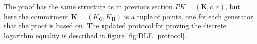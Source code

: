 The proof has the same structure as in previous section \( PK = (\boldsymbol{K}, c, r) \), but here the commitment \( \boldsymbol{K} = (K_\mathrm{G}, K_\mathrm{H}) \) is a tuple of points, one for each generator that the proof is based on. The updated protocol for proving the discrete logarithm equality is described in figure \ref{fig:DLE_protocol}.


